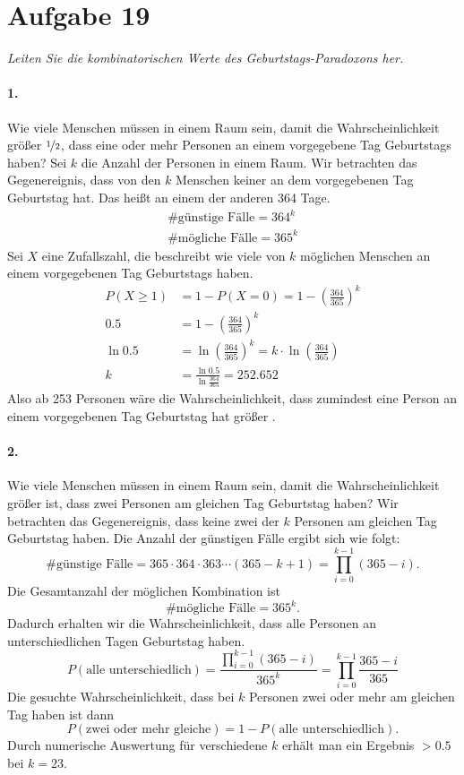 \section{Aufgabe 19}
\textit{Leiten Sie die kombinatorischen Werte des Geburtstags-Paradoxons her.}
\paragraph{1. } Wie viele Menschen müssen in einem Raum sein, damit die Wahrscheinlichkeit
größer $\nicefrac{1}{2}$, dass eine oder mehr Personen an einem vorgegebene
Tag Geburtstags haben?\vspace*{1em}\newline
Sei $k$ die Anzahl der Personen in einem Raum. Wir betrachten das Gegenereignis, dass von den $k$
Menschen keiner an dem vorgegebenen Tag Geburtstag hat. Das heißt an einem der anderen 364 Tage.
\begin{gather*}    
    \text{\# günstige Fälle} = 364^k\\
    \text{\# mögliche Fälle} = 365^k
\end{gather*}
Sei $X$ eine Zufallszahl, die beschreibt wie viele von $k$ möglichen Menschen an einem vorgegebenen
Tag Geburtstags haben.
\begin{align*}    
    P(X\ge 1) &= 1 - P(X=0) = 1 - \left(\frac{364}{365}\right)^k\\
    0.5 &= 1 - \left(\frac{364}{365}\right)^k\\
    \ln0.5 &= \ln\left(\frac{364}{365}\right)^k= k\cdot \ln\left(\frac{364}{365}\right)\\
    k &= \frac{\ln 0.5}{\ln \frac{364}{365}} = 252.652
\end{align*}
Also ab 253 Personen wäre die Wahrscheinlichkeit, dass zumindest eine Person an einem
vorgegebenen Tag Geburtstag hat größer .
\paragraph{2. } Wie viele Menschen müssen in einem Raum sein,
damit die Wahrscheinlichkeit größer  ist, dass zwei
Personen am gleichen Tag Geburtstag haben?\vspace*{1em}\newline
Wir betrachten das Gegenereignis, dass keine zwei der $k$ Personen am gleichen Tag 
Geburtstag haben. Die Anzahl der günstigen Fälle ergibt sich wie folgt:
\[
    \text{\# günstige Fälle} = 365\cdot 364\cdot 363\cdots (365 - k + 1) = \prod_{i = 0}^{k - 1} (365 - i).
\]
Die Gesamtanzahl der möglichen Kombination ist
\[
    \text{\# mögliche Fälle} = 365^k.
\]
Dadurch erhalten wir die Wahrscheinlichkeit, dass alle Personen an unterschiedlichen Tagen
Geburtstag haben.
\[
    P(\text{alle unterschiedlich}) = \frac{\prod_{i = 0}^{k - 1} (365 - i)}{365^k} = \prod_{i = 0}^{k - 1} \frac{365 - i}{365}
\]
Die gesuchte Wahrscheinlichkeit, dass bei $k$ Personen zwei oder mehr am gleichen Tag haben ist dann
\[
    P(\text{zwei oder mehr gleiche}) = 1 - P(\text{alle unterschiedlich}).
\]
Durch numerische Auswertung für verschiedene $k$ erhält man ein Ergebnis $> 0.5$ bei $k = 23$.
